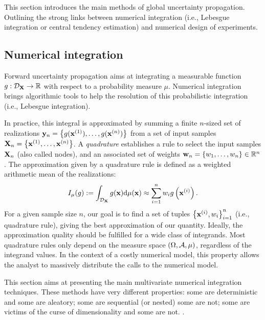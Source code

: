 This section introduces the main methods of global uncertainty propagation. 
Outlining the strong links between numerical integration (i.e., Lebesgue integration or central tendency estimation) and numerical design of experiments. 


\subsection{Numerical integration}

Forward uncertainty propagation aims at integrating a measurable function $g: \mathcal{D}_{{\bf X}} \rightarrow \mathbb{R}$ with respect to a probability measure $\mu$.
Numerical integration brings algorithmic tools to help the resolution of this probabilistic integration (i.e., Lebesgue integration). 

In practice, this integral is approximated by summing a finite $n$-sized set of realizations ${\bf y}_n = \left\{g({\bf x}^{(1)}), \dots, g({\bf x}^{(n)})\right\}$ from a set of input samples ${\bf X}_n = \left\{{\bf x}^{(1)}, \dots, {\bf x}^{(n)}\right\}$. 
A \textit{quadrature} establishes a rule to select the input samples ${\bf X}_n$ (also called nodes), and an associated set of weights ${\bf w}_n = \{w_1, \dots, w_n\} \in \mathbb{R}^n$. 
The approximation given by a quadrature rule is defined as a weighted arithmetic mean of the realizations:
\begin{equation}
    I_{\mu}(g) := \int_{\mathcal{D}_{\bf X}} g({\bf x}) \mathrm{d}\mu({\bf x}) \approx \sum_{i=1}^n w_i g\left({\bf x}^{(i)}\right).
    \label{eq:quadrature_rule}
\end{equation}
For a given sample size $n$, our goal is to find a set of tuples $\left\{{\bf x}^{(i)}, w_i \right\}_{i=1}^n$ (i.e., quadrature rule), giving the best approximation of our quantity. 
Ideally, the approximation quality should be fulfilled for a wide class of integrands. 
Most quadrature rules only depend on the measure space $(\Omega, \mathcal{A}, \mu)$, regardless of the integrand values.
In the context of a costly numerical model, this property allows the analyst to massively distribute the calls to the numerical model. 

This section aims at presenting the main multivariate numerical integration techniques. 
These methods have very different properties: 
some are deterministic and some are aleatory; 
some are sequential (or nested) some are not; 
some are victims of the curse of dimensionality and some are not. 
.

